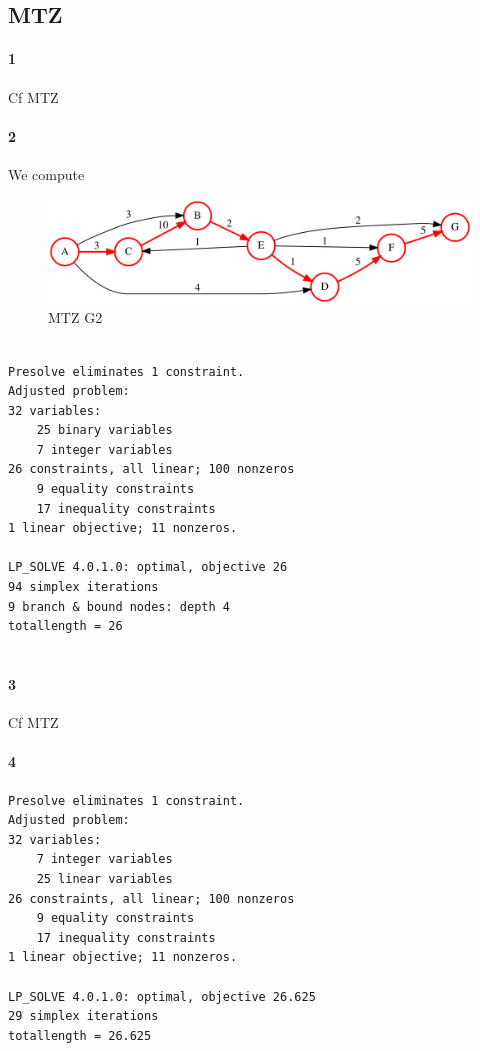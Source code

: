 \documentclass{article}
\begin{document}
\subsection{MTZ}

\paragraph{1}

Cf MTZ

\paragraph{2}

We compute

\begin{figure}[H]
  \centering
  \includegraphics[scale=0.3]{graph/MTZ_G2}
  \caption{MTZ G2}
\end{figure}

\begin{lstlisting}

Presolve eliminates 1 constraint.
Adjusted problem:
32 variables:
	25 binary variables
	7 integer variables
26 constraints, all linear; 100 nonzeros
	9 equality constraints
	17 inequality constraints
1 linear objective; 11 nonzeros.

LP_SOLVE 4.0.1.0: optimal, objective 26
94 simplex iterations
9 branch & bound nodes: depth 4
totallength = 26
  
\end{lstlisting}

\paragraph{3}

Cf MTZ

\paragraph{4}

\begin{lstlisting}
Presolve eliminates 1 constraint.
Adjusted problem:
32 variables:
	7 integer variables
	25 linear variables
26 constraints, all linear; 100 nonzeros
	9 equality constraints
	17 inequality constraints
1 linear objective; 11 nonzeros.

LP_SOLVE 4.0.1.0: optimal, objective 26.625
29 simplex iterations
totallength = 26.625
  
\end{lstlisting}
\end{document}
